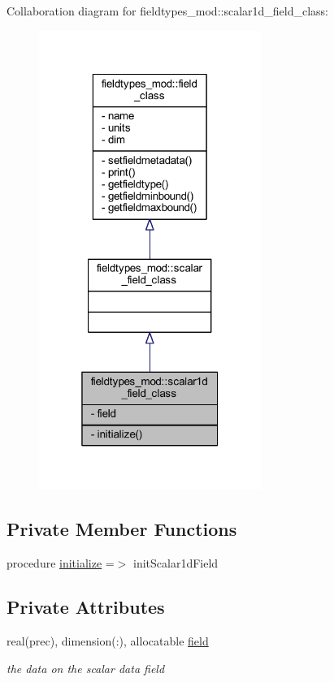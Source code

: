 Collaboration diagram for fieldtypes\+\_\+mod\+:\+:scalar1d\+\_\+field\+\_\+class\+:\nopagebreak
\begin{figure}[H]
\begin{center}
\leavevmode
\includegraphics[width=205pt]{structfieldtypes__mod_1_1scalar1d__field__class__coll__graph}
\end{center}
\end{figure}
\subsection*{Private Member Functions}
\begin{DoxyCompactItemize}
\item 
procedure \mbox{\hyperlink{structfieldtypes__mod_1_1scalar1d__field__class_aa5e83bedb5d56d7e666fde274435a04f}{initialize}} =$>$ init\+Scalar1d\+Field
\end{DoxyCompactItemize}
\subsection*{Private Attributes}
\begin{DoxyCompactItemize}
\item 
real(prec), dimension(\+:), allocatable \mbox{\hyperlink{structfieldtypes__mod_1_1scalar1d__field__class_ab5ea19982bf6390d99095d2ed1509263}{field}}
\begin{DoxyCompactList}\small\item\em the data on the scalar data field \end{DoxyCompactList}\end{DoxyCompactItemize}


